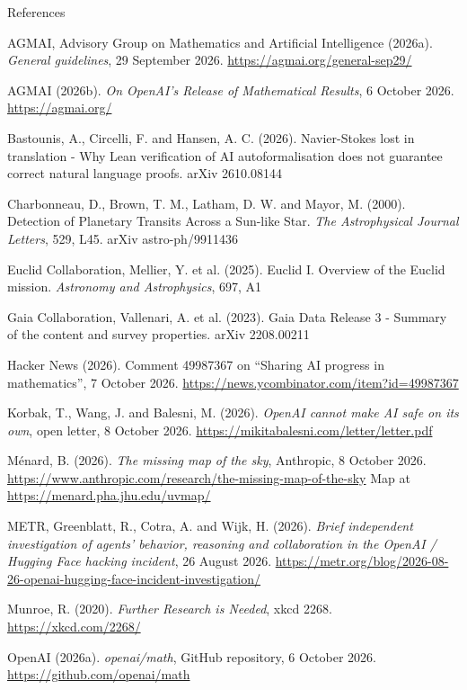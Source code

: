 \documentclass[aspectratio=169,11pt]{beamer}
\begin{document}
\begin{frame}{References}
  \fontsize{5.4}{6.3}\selectfont\raggedright
  \setlength{\parskip}{0.08em}
  AGMAI, Advisory Group on Mathematics and Artificial Intelligence (2026a). \emph{General guidelines}, 29 September 2026. \url{https://agmai.org/general-sep29/}

  AGMAI (2026b). \emph{On OpenAI's Release of Mathematical Results}, 6 October 2026. \url{https://agmai.org/}

  Bastounis, A., Circelli, F. and Hansen, A. C. (2026). Navier-Stokes lost in translation - Why Lean verification of AI autoformalisation does not guarantee correct natural language proofs. arXiv 2610.08144

  Charbonneau, D., Brown, T. M., Latham, D. W. and Mayor, M. (2000). Detection of Planetary Transits Across a Sun-like Star. \emph{The Astrophysical Journal Letters}, 529, L45. arXiv astro-ph/9911436

  Euclid Collaboration, Mellier, Y. et al. (2025). Euclid I. Overview of the Euclid mission. \emph{Astronomy and Astrophysics}, 697, A1

  Gaia Collaboration, Vallenari, A. et al. (2023). Gaia Data Release 3 - Summary of the content and survey properties. arXiv 2208.00211

  Hacker News (2026). Comment 49987367 on ``Sharing AI progress in mathematics'', 7 October 2026. \url{https://news.ycombinator.com/item?id=49987367}

  Korbak, T., Wang, J. and Balesni, M. (2026). \emph{OpenAI cannot make AI safe on its own}, open letter, 8 October 2026. \url{https://mikitabalesni.com/letter/letter.pdf}

  M\'enard, B. (2026). \emph{The missing map of the sky}, Anthropic, 8 October 2026. \url{https://www.anthropic.com/research/the-missing-map-of-the-sky} Map at \url{https://menard.pha.jhu.edu/uvmap/}

  METR, Greenblatt, R., Cotra, A. and Wijk, H. (2026). \emph{Brief independent investigation of agents' behavior, reasoning and collaboration in the OpenAI / Hugging Face hacking incident}, 26 August 2026. \url{https://metr.org/blog/2026-08-26-openai-hugging-face-incident-investigation/}

  Munroe, R. (2020). \emph{Further Research is Needed}, xkcd 2268. \url{https://xkcd.com/2268/}

  OpenAI (2026a). \emph{openai/math}, GitHub repository, 6 October 2026. \url{https://github.com/openai/math}


\end{frame}
\end{document}
